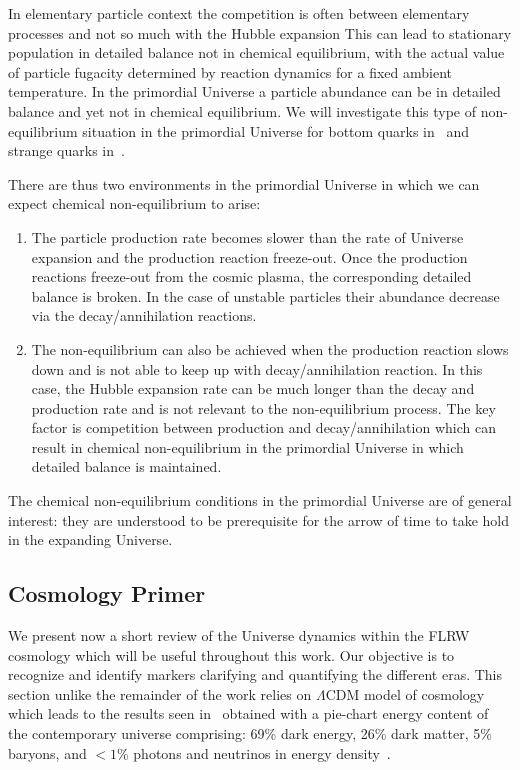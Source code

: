 In elementary particle context the competition is often between elementary processes and not so much with the Hubble expansion This can lead to stationary population in detailed balance not in chemical equilibrium, with the actual value of particle fugacity determined by reaction dynamics for a fixed ambient temperature. In the primordial Universe a particle abundance can be in detailed balance and yet not in chemical equilibrium. We will investigate this type of non-equilibrium situation in the primordial Universe for bottom quarks in~ and strange quarks in~.

There are thus two environments in the primordial Universe in which we can expect chemical non-equilibrium to arise:
\begin{enumerate}
\item The particle production rate becomes slower than the rate of Universe expansion and the production reaction freeze-out. Once the production reactions freeze-out from the cosmic plasma, the corresponding detailed balance is broken. In the case of unstable particles their abundance decrease via the decay/annihilation reactions.
%
\item The non-equilibrium can also be achieved when the production reaction slows down and is not able to keep up with decay/annihilation reaction. In this case, the Hubble expansion rate can be much longer than the decay and production rate and is not relevant to the non-equilibrium process. The key factor is competition between production and decay/annihilation which can result in chemical non-equilibrium in the primordial Universe in which detailed balance is maintained.
\end{enumerate}
The chemical non-equilibrium conditions in the primordial Universe are of general interest: they are understood to be prerequisite for the arrow of time to take hold in the expanding Universe.


\subsection{Cosmology Primer}
\label{sec:flrw}
We present now a short review of the Universe dynamics within the FLRW cosmology which will be useful throughout this work. Our objective is to recognize and identify markers clarifying and quantifying the different eras. This section unlike the remainder of the work relies on $\Lambda\mathrm{CDM}$ model of cosmology which leads to the results seen in~ obtained with a pie-chart energy content of the contemporary universe comprising: 69\% dark energy, 26\% dark matter, 5\% baryons, and $<1$\% photons and neutrinos in energy density~\cite{Davis:2003ad,Planck:2018vyg}. 

